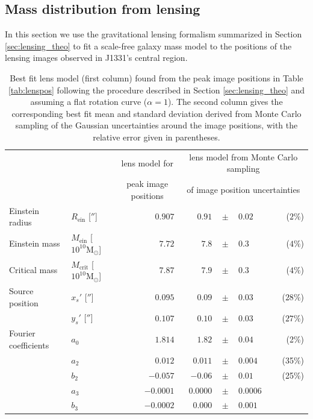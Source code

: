 \documentclass[useAMS,usenatbib]{mnras}
\begin{document}
\subsection{Mass distribution from lensing} \label{sec:results_lensing}

In this section we use the gravitational lensing formalism summarized in Section \ref{sec:lensing_theo} to fit a scale-free galaxy mass model to the positions of the lensing images observed in J1331's central region.

\begin{table}
\centering
\caption{Best fit lens model (first column) found from the peak image positions in Table \ref{tab:lenspos} following the procedure described in Section \ref{sec:lensing_theo} and assuming a flat rotation curve ($\alpha = 1$). The second column gives the corresponding best fit mean and standard deviation derived from Monte Carlo sampling of the Gaussian uncertainties around the image positions, with the relative error given in parentheses.}
\begin{tabular}{llrrclr}
\hline
 &  & \multicolumn{1}{c}{lens model for} &\multicolumn{4}{c}{lens model from Monte Carlo sampling  } \\
 &  & \multicolumn{1}{c}{peak image positions}  & \multicolumn{4}{c}{of image position uncertainties}  \\ \hline
Einstein radius      & $R_\text{ein}$ [$''$]             & $0.907$ & $0.91$  & $\pm$ & $     0.02$ & ($2\%$)\\
Einstein mass        & $M_\text{ein}$ [$10^{10} \text{M}_\odot$]  & $7.72$  & $7.8 $  & $\pm$ & $      0.3$ & ($4\%$) \\
Critical mass        & $M_\text{crit}$ [$10^{10} \text{M}_\odot$] & $7.87$  & $7.9$   & $\pm$ & $      0.3$ & ($4\%$)\\
Source position      & $x_s'$ [$''$]                      & $0.095$ & $0.09 $ & $\pm$ & $     0.03$ & ($28\%$)\\
                     & $y_s'$ [$''$]                     & $0.107$ & $0.10 $ & $\pm$ & $     0.03$ & ($27\%$)\\
Fourier coefficients & $a_0$                               & $1.814$ & $1.82 $ & $\pm$ & $   0.04$ & (2\%)\\
                     & $a_2$                               & $0.012$ & $ 0.011 $ & $\pm$ & $    0.004$ & (35\%)\\
                     & $b_2$                               & $-0.057$ & $-0.06 $  & $\pm$ & $  0.01$ & (25\%)\\
                     & $a_3$                               & $-0.0001$& $0.0000 $ & $\pm$ & $   0.0006$ & \\
                     & $b_3$                               & $-0.0002$&$0.000 $   & $\pm$ & $  0.001$ & \\\hline
\end{tabular}  
\label{tab:bestfitlensmodel} 
\end{table}
\end{document}
